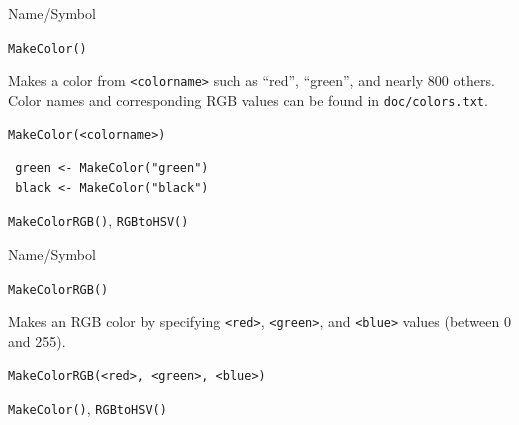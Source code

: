 \begin{desc}{Name/Symbol}
\item[Name/Symbol]	\verb+MakeColor()+

\item[Description] Makes a color from \verb+<colorname>+ such as
  ``red'', ``green'', and nearly 800 others.  Color names and
  corresponding RGB values can be found in \verb+doc/colors.txt+.

\item[Usage]
\begin{verbatim}
MakeColor(<colorname>)
\end{verbatim}

\item[Example]	
\begin{verbatim}
 green <- MakeColor("green")
 black <- MakeColor("black")
\end{verbatim}
\item[See Also]	\verb+MakeColorRGB()+, \verb+RGBtoHSV()+
\end{desc}

\begin{desc}{Name/Symbol}
\item[Name/Symbol]	\verb+MakeColorRGB()+ 

\item[Description] Makes an RGB color by specifying \verb+<red>+,
  \verb+<green>+, and \verb+<blue>+ values (between 0 and 255).

\item[Usage]		
\begin{verbatim}
MakeColorRGB(<red>, <green>, <blue>)
\end{verbatim}

\item[Example]	

\item[See Also]	\verb+MakeColor()+, \verb+RGBtoHSV()+
\end{desc}



